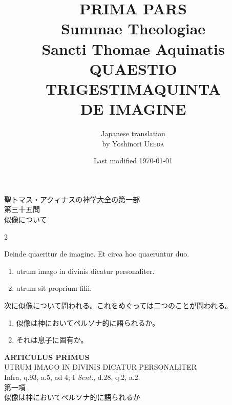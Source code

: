 \documentclass[paper=a4paper,fontsize=10pt,jafontsize=9pt,titlepage]{jlreq}
\title{{\bfseries PRIMA PARS}\\{\Huge Summae Theologiae}\\Sancti Thomae
Aquinatis\\{\sffamily QUAESTIO TRIGESTIMAQUINTA}\\DE IMAGINE}
\author{Japanese translation\\by Yoshinori {\scshape Ueeda}}
\date{Last modified \today}
\begin{document}
\maketitle
\thispagestyle{empty}
\begin{center}
{\Large 聖トマス・アクィナスの神学大全の第一部\\第三十五問\\似像について}
\end{center}



\begin{paracol}{2}

{\Huge D}einde quaeritur de imagine. Et circa hoc quaeruntur
 duo. 
 

\begin{enumerate}
 \item utrum imago in divinis dicatur personaliter. 
 \item utrum sit proprium filii.
\end{enumerate}

\switchcolumn

次に似像について問われる。これをめぐっては二つのことが問われる。

\begin{enumerate}
 \item 似像は神においてペルソナ的に語られるか。
 \item それは息子に固有か。
\end{enumerate}

\end{paracol}

\newpage


\begin{center}
{\Large {\bfseries ARTICULUS PRIMUS}}\\
{\large UTRUM IMAGO IN DIVINIS DICATUR PERSONALITER}\\
{\footnotesize Infra, q.93, a.5, ad 4; I {\itshape Sent.}, d.28, q.2,
 a.2.}\\
{\Large 第一項\\似像は神においてペルソナ的に語られるか}
\end{center}


{}
\setcounter{section}{1}
\setcounter{subsection}{0}
\end{document}
